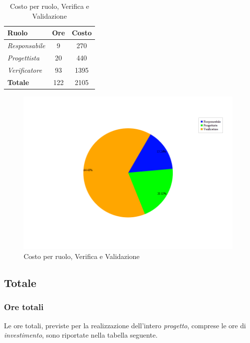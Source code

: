 \begin{table}[H]
	\begin{center}
		\begin{tabular}{|l|c|c|}
			\hline
			\textbf{Ruolo}	& \textbf{Ore} &	\textbf{Costo}	 \\
			\hline
			\textit{Responsabile}	&	9	&	270		\\
			\hline
			\textit{Progettista}		&	20	&	440		\\
			\hline
			\textit{Verificatore}	&	93	&	1395	\\
			\hline
			\textbf{Totale}	&	122	&	2105	\\
			\hline
		\end{tabular}
	\end{center}
	\caption{Costo per ruolo, Verifica e Validazione}
\end{table}

\begin{figure}[H]
	\centering
	\includegraphics[scale=0.4]{immagini/Grafi/CostoVV}
	\caption{Costo per ruolo, Verifica e Validazione}
\end{figure}

\subsection{Totale}
\subsubsection{Ore totali}
Le ore totali, previste per la realizzazione dell'intero \textit{progetto}, comprese le ore di \textit{investimento}, sono riportate nella tabella seguente.

